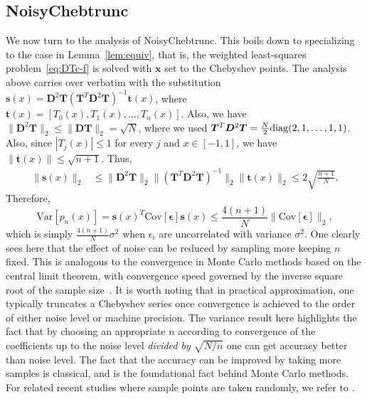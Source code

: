 \documentclass[final,onefignum,onetabnum]{siamart220329}
\def\mainalg{NoisyChebtrunc}
\newcommand{\diag}{{\rm diag}}
\newcommand{\vct}[1]{\bm{#1}}
\newcommand{\mtx}[1]{\bm{#1}}
\begin{document}
\subsection{\mainalg}
We now turn to the analysis of \mainalg. 
This boils down to specializing to the case in Lemma~\ref{lem:equiv}, that is, the weighted least-squares problem~\eqref{eq:DTc-f} is solved with $\vct{x}$ set to the Chebyshev points. 
The analysis above carries over verbatim with the substitution $\vct{s}(x)=\mtx{D}^2 \mtx{T} (\mtx{T}^T \mtx{D}^2 \mtx{T})^{-1} \vct{t}(x)$, where $\vct{t}(x)=[T_0(x),T_1(x),\dots,T_n(x)]$. 
Also, we have $\| \mtx{D}^2 \mtx{T} \|_2 \leq \| \mtx{D} \mtx{T} \|_2 = \sqrt{N}$, where we used $\mtx{T}^T \mtx{D}^2 \mtx{T} =\frac{N}{2} \diag (2,1,\dots,1,1)$.
Also, since $|T_j(x)| \leq 1$ for every $j$ and $x \in [-1,1]$, we have $\| \vct{t}(x) \| \leq \sqrt{n+1}$.
Thus,
\begin{align}
	\| \vct{s}(x) \|_2 &\leq \| \mtx{D}^2 \mtx{T} \|_2 \| (\mtx{T}^T \mtx{D}^2 \mtx{T})^{-1} \|_2 \| \vct{t}(x) \|_2 \leq 2 \sqrt{\frac{n+1}{N}}. \label{norm_s}
\end{align}
Therefore, 
\begin{equation}  \label{eq:varsD}
	\mbox{Var}[p_n(x)] = \vct{s}(x)^T \mbox{Cov}[\vct{\epsilon}] \vct{s}(x) \leq \frac{4(n+1)}{N}\|\mbox{Cov}[\vct{\epsilon}]\|_2,
\end{equation}
which is simply $\frac{4(n+1)}{N}\sigma^2$ when $\epsilon_i$  are uncorrelated with variance $\sigma^2$. 
One clearly sees here that the effect of noise can be reduced by sampling more {keeping $n$ fixed}. This is analogous to the convergence in Monte Carlo methods based on the central limit theorem, with convergence speed governed by the inverse square root of the sample size~\cite{cohen2,MCLSpreprint}. 
It is worth noting that {in practical approximation}, one typically truncates a Chebyshev series once convergence is achieved to the order of either noise level or machine precision. The variance result here highlights the fact that by choosing an appropriate $n$ according to convergence of the coefficients up to the noise level \emph{divided by $\sqrt{N/n}$} 
one can get accuracy better than noise level. 
{The fact that the accuracy can be improved by taking more samples is classical, and is the foundational fact behind Monte Carlo methods. 
	For related recent studies where sample points are taken randomly, we refer to \cite{cohen2013stability,cohen2,migliorati2015convergence}. 
}
\end{document}
